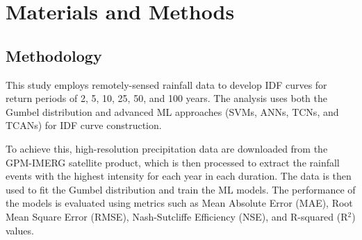 \section{Materials and Methods}
\subsection{Methodology}
This study employs remotely-sensed rainfall data to develop IDF curves for return periods of 2, 5, 10, 25, 50, and 100 years. The analysis uses both the Gumbel distribution and advanced ML approaches (SVMs, ANNs, TCNs, and TCANs) for IDF curve construction.

\vspace{1em}

To achieve this, high-resolution precipitation data are downloaded from the GPM-IMERG satellite product, which is then processed to extract the rainfall events with the highest intensity for each year in each duration. The data is then used to fit the Gumbel distribution and train the ML models. The performance of the models is evaluated using metrics such as Mean Absolute Error (MAE), Root Mean Square Error (RMSE), Nash-Sutcliffe Efficiency (NSE), and R-squared (R$^{2}$) values.





